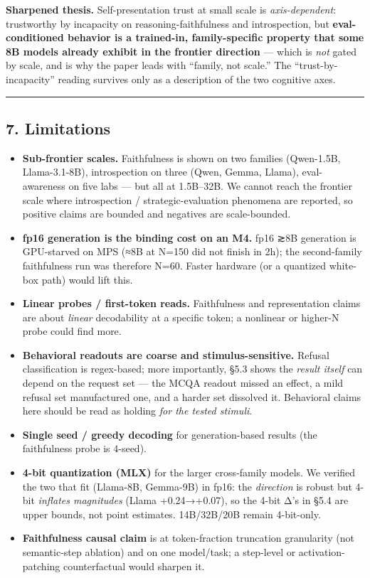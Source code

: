 \documentclass[
]{article}
\providecommand{\tightlist}{%
  \setlength{\itemsep}{0pt}\setlength{\parskip}{0pt}}
\begin{document}
\textbf{Sharpened thesis.} Self-presentation trust at small scale is
\emph{axis-dependent}: trustworthy by incapacity on
reasoning-faithfulness and introspection, but \textbf{eval-conditioned
behavior is a trained-in, family-specific property that some 8B models
already exhibit in the frontier direction} --- which is \emph{not} gated
by scale, and is why the paper leads with ``family, not scale.'' The
``trust-by-incapacity'' reading survives only as a description of the
two cognitive axes.

\begin{center}\rule{0.5\linewidth}{0.5pt}\end{center}

\subsection{7. Limitations}\label{limitations}

\begin{itemize}
\tightlist
\item
  \textbf{Sub-frontier scales.} Faithfulness is shown on two families
  (Qwen-1.5B, Llama-3.1-8B), introspection on three (Qwen, Gemma,
  Llama), eval-awareness on five labs --- but all at 1.5B--32B. We
  cannot reach the frontier scale where introspection /
  strategic-evaluation phenomena are reported, so positive claims are
  bounded and negatives are scale-bounded.
\item
  \textbf{fp16 generation is the binding cost on an M4.} fp16 ≳8B
  generation is GPU-starved on MPS (≈8B at N=150 did not finish in 2h);
  the second-family faithfulness run was therefore N=60. Faster hardware
  (or a quantized white-box path) would lift this.
\item
  \textbf{Linear probes / first-token reads.} Faithfulness and
  representation claims are about \emph{linear} decodability at a
  specific token; a nonlinear or higher-N probe could find more.
\item
  \textbf{Behavioral readouts are coarse and stimulus-sensitive.}
  Refusal classification is regex-based; more importantly, §5.3 shows
  the \emph{result itself} can depend on the request set --- the MCQA
  readout missed an effect, a mild refusal set manufactured one, and a
  harder set dissolved it. Behavioral claims here should be read as
  holding \emph{for the tested stimuli}.
\item
  \textbf{Single seed / greedy decoding} for generation-based results
  (the faithfulness probe is 4-seed).
\item
  \textbf{4-bit quantization (MLX)} for the larger cross-family models.
  We verified the two that fit (Llama-8B, Gemma-9B) in fp16: the
  \emph{direction} is robust but 4-bit \emph{inflates magnitudes} (Llama
  +0.24→+0.07), so the 4-bit Δ's in §5.4 are upper bounds, not point
  estimates. 14B/32B/20B remain 4-bit-only.
\item
  \textbf{Faithfulness causal claim} is at token-fraction truncation
  granularity (not semantic-step ablation) and on one model/task; a
  step-level or activation-patching counterfactual would sharpen it.
\end{itemize}
\end{document}
